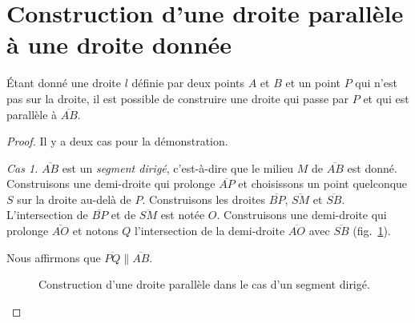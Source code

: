 \section{Construction d'une droite parallèle à une droite donnée}\label{s.parallel}

\begin{theorem}\label{thm.straight-parallel}
Étant donné une droite $l$ définie par deux points $A$ et $B$ et un point $P$ qui n'est pas sur la droite, il est possible de construire une droite qui passe par $P$ et qui est parallèle à $\overline{AB}$.
\end{theorem}

\begin{proof}

Il y a deux cas pour la démonstration.

\textit{Cas 1.}
 $\overline{AB}$ est un \emph{segment dirigé}, c'est-à-dire que  le milieu $M$ de $\overline{AB}$ est donné.  Construisons une demi-droite qui prolonge $\overline{AP}$ et choisissons un point quelconque $S$ sur la droite au-delà de $P$. Construisons les droites $\overline{BP}$, $\overline{SM}$ 
 et $\overline{SB}$. L'intersection de $\overline{BP}$ et de $\overline{SM}$ est notée $O$. Construisons une demi-droite qui prolonge $\overline{AO}$ et notons $Q$ l'intersection de la demi-droite $\overline{AO}$ avec $\overline{SB}$  (fig.~\ref{f.se-parallel-directed}).

Nous affirmons que  $\overline{PQ}\parallel \overline{AB}$. 

\begin{figure}[ht]
\centering
{}

\caption{Construction d'une droite parallèle dans le cas d'un segment  dirigé.}\label{f.se-parallel-directed}
\end{figure}



\end{proof}
